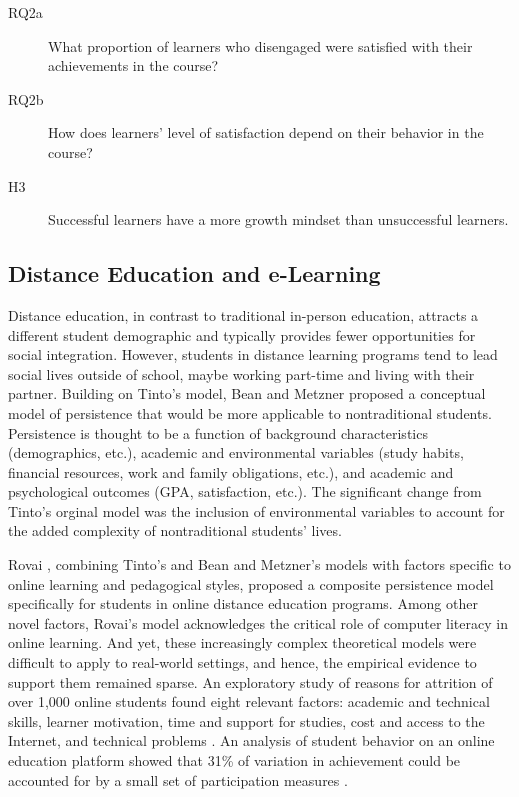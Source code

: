 \documentclass{sigchi}\usepackage[]{graphicx}\usepackage[]{color}
\begin{document}
\begin{description}
  \item[RQ2a] What proportion of learners who disengaged were satisfied with their achievements in the course?
  \item[RQ2b] How does learners' level of satisfaction depend on their behavior in the course?
  \item[H3] Successful learners have a more growth mindset than unsuccessful learners.
\end{description}

\subsection{Distance Education and e-Learning}

Distance education, in contrast to traditional in-person education, attracts a different student demographic and typically provides fewer opportunities for social integration. However, students in distance learning programs tend to lead social lives outside of school, maybe working part-time and living with their partner. Building on Tinto's model, Bean and Metzner \citeyear{bean1985conceptual} proposed a conceptual model of persistence that would be more applicable to nontraditional students. Persistence is thought to be a function of background characteristics (demographics, etc.), academic and environmental variables (study habits, financial resources, work and family obligations, etc.), and academic and psychological outcomes (GPA, satisfaction, etc.). The significant change from Tinto's orginal model was the inclusion of environmental variables to account for the added complexity of nontraditional students' lives.

Rovai \citeyear{rovai2003search}, combining Tinto's and Bean and Metzner's models with factors specific to online learning and pedagogical styles, proposed a composite persistence model specifically for students in online distance education programs. Among other novel factors, Rovai's model acknowledges the critical role of computer literacy in online learning. And yet, these increasingly complex theoretical models were difficult to apply to real-world settings, and hence, the empirical evidence to support them remained sparse. An exploratory study of reasons for attrition of over 1,000 online students found eight relevant factors: academic and technical skills, learner motivation, time and support for studies, cost and access to the Internet, and technical problems \cite{muilenburg2005student}. An analysis of student behavior on an online education platform showed that 31\% of variation in achievement could be accounted for by a small set of participation measures \cite{morris2005tracking}.
\end{document}
